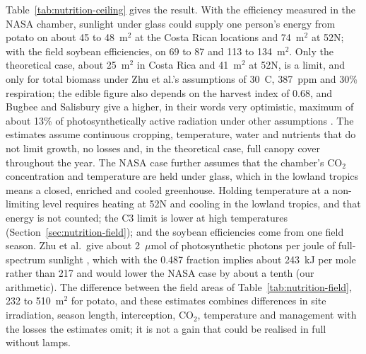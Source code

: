 Table~\ref{tab:nutrition-ceiling} gives the result. With the efficiency measured in the NASA chamber, sunlight under glass could supply one person's energy from potato on about 45 to 48~m$^2$ at the Costa Rican locations and 74~m$^2$ at 52\textdegree{}N; with the field soybean efficiencies, on 69 to 87 and 113 to 134~m$^2$. Only the theoretical case, about 25~m$^2$ in Costa Rica and 41~m$^2$ at 52\textdegree{}N, is a limit, and only for total biomass under Zhu et al.'s assumptions of 30~\textdegree{}C, 387~ppm and 30\% respiration; the edible figure also depends on the harvest index of 0.68, and Bugbee and Salisbury give a higher, in their words very optimistic, maximum of about 13\% of photosynthetically active radiation under other assumptions \cite[p.~869]{bugbee1988limits}. The estimates assume continuous cropping, temperature, water and nutrients that do not limit growth, no losses and, in the theoretical case, full canopy cover throughout the year. The NASA case further assumes that the chamber's CO$_2$ concentration and temperature are held under glass, which in the lowland tropics means a closed, enriched and cooled greenhouse. Holding temperature at a non-limiting level requires heating at 52\textdegree{}N and cooling in the lowland tropics, and that energy is not counted; the C3 limit is lower at high temperatures (Section~\ref{sec:nutrition-field}); and the soybean efficiencies come from one field season. Zhu et al.\ give about 2~$\mu$mol of photosynthetic photons per joule of full-spectrum sunlight \cite[p.~244]{zhu2010photosynthesis}, which with the 0.487 fraction implies about 243~kJ per mole rather than 217 and would lower the NASA case by about a tenth (our arithmetic). The difference between the field areas of Table~\ref{tab:nutrition-field}, 232 to 510~m$^2$ for potato, and these estimates combines differences in site irradiation, season length, interception, CO$_2$, temperature and management with the losses the estimates omit; it is not a gain that could be realised in full without lamps.

